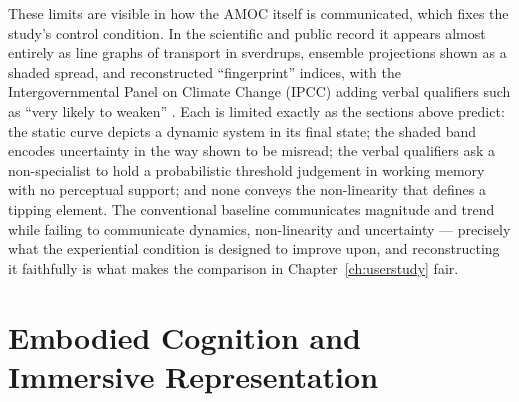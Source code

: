These limits are visible in how the AMOC itself is communicated, which fixes the study's control condition. In the scientific and public record it appears almost entirely as line graphs of transport in sverdrups, ensemble projections shown as a shaded spread, and reconstructed ``fingerprint'' indices, with the Intergovernmental Panel on Climate Change (IPCC) adding verbal qualifiers such as ``very likely to weaken'' \citep{caesar2018, ipcc2021}. Each is limited exactly as the sections above predict: the static curve depicts a dynamic system in its final state; the shaded band encodes uncertainty in the way shown to be misread; the verbal qualifiers ask a non-specialist to hold a probabilistic threshold judgement in working memory with no perceptual support; and none conveys the non-linearity that defines a tipping element. The conventional baseline communicates magnitude and trend while failing to communicate dynamics, non-linearity and uncertainty --- precisely what the experiential condition is designed to improve upon, and reconstructing it faithfully is what makes the comparison in Chapter~\ref{ch:userstudy} fair.

\section{Embodied Cognition and Immersive Representation}
\label{sec:embodied-viz}


